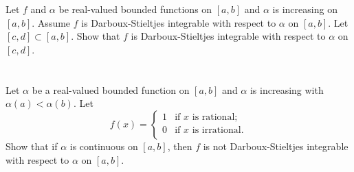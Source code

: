 \documentclass[]{article}
\begin{document}
\newpage
\section{}
Let $f$ and $\alpha$ be real-valued bounded functions on $[a,b]$ and $\alpha$ is increasing on $[a,b]$. 
Assume $f$ is Darboux-Stieltjes integrable with respect to $\alpha$ on $[a,b]$. 
Let $[c,d] \subset [a,b]$. 
Show that $f$ is Darboux-Stieltjes integrable with respect to $\alpha$ on $[c,d]$.













\newpage
\section{}
Let $\alpha$ be a real-valued bounded function on $[a,b]$ and $\alpha$ is increasing with $\alpha(a) < \alpha(b)$. 
Let \[
    f(x) = \begin{cases}
        1   &\text{if $x$ is rational};\\
        0   &\text{if $x$ is irrational}.\\
    \end{cases}
\] Show that if $\alpha$ is continuous on $[a,b]$, then $f$ is not Darboux-Stieltjes integrable with respect to $\alpha$ on $[a,b]$.
\end{document}
